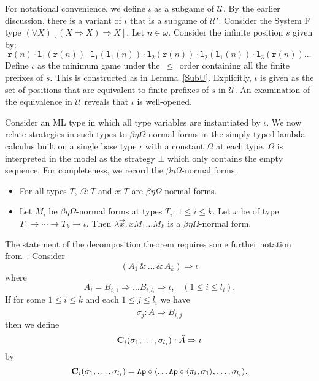 \documentclass[a4paper,11pt]{article}
\newcommand{\UU}{\mathcal{U}}
\newcommand{\llwith}{\, \& \,}
\newcommand{\ginc}{\, \trianglelefteq \,}
\newcommand{\fr}{\mathtt{r}}
\newcommand{\fl}[1]{\mathtt{l}_{#1}}
\newcommand{\LUU}{\mathcal{U'}}
\newcommand{\lang}{\langle}
\newcommand{\rang}{\rangle}
\begin{document}
For notational convenience, we define $\iota$ as a subgame of
$\UU$.  By the earlier discussion, there is a variant of $\iota$
that is a subgame of $\LUU$.  Consider the System F type $(\forall
X) [(X \Rightarrow X) \Rightarrow X] $.  Let $n \in \omega$.
Consider the infinite position $s$ given by:
$$ \fr(n) \cdot \fl{1}(\fr(n)) \cdot \fl{1}(\fl{1}(n)) \cdot
\fl{2}(\fr(n)) \cdot \fl{2}(\fl{1}(n))
\cdot \fl{3}(\fr(n)) \ldots $$ Define $\iota$ as the minimum game
under the $\ginc$ order containing all the finite prefixes of $s$.
This is constructed as in Lemma~\ref{SubU}.  Explicitly, $\iota$ is
given  as  the set of positions that are equivalent to
finite prefixes of
$s$ in $\UU$.  An examination of the equivalence
in $\UU$ reveals that $\iota$ is well-opened.

Consider an ML type in which all type variables are instantiated
by $\iota$.  We now relate strategies in such types  to
$\beta\eta\Omega$-normal forms in the simply typed lambda calculus
built on a single base type $\iota$ with a constant $\Omega$ at
each type. $\Omega$ is interpreted in the model as the strategy
$\bot$ which only contains the empty sequence. For completeness,
we record the  $\beta\eta\Omega$-normal forms.
\begin{itemize}
\item For all types $T$, $\Omega : T$ and $x : T$  are $\beta\eta\Omega$ normal forms.
\item Let $M_i$ be $\beta\eta\Omega$-normal forms at types $T_i$, $1
  \leq i \leq k$.  Let $x$ be of type $T_1 \rightarrow \cdots \rightarrow
T_k \rightarrow \iota$.   Then $\lambda \vec{x}. \, x   M_1
\ldots M_k$ is a $\beta\eta\Omega$-normal form.
\end{itemize}

The statement of the decomposition theorem requires some further
notation from~\cite{AJM00}.   Consider
$$(A_1\llwith\dots\llwith A_k)\Rightarrow \iota$$ where
$$A_i=B_{i,1}\Rightarrow \dots B_{i,l_i}\Rightarrow \iota, \; \;\;
(1\leq i\leq l_i).$$ If for some $1\leq i\leq k$ and each $1\leq
j\leq l_i$ we have
$$\sigma_j:\tilde{A}\Rightarrow B_{i,j}$$ then we define
$${\bf C}_i(\sigma_1,\dots,\sigma_{l_i}):\tilde{A}\Rightarrow \iota$$ by
$${\bf
C}_i(\sigma_1,\dots,\sigma_{l_i})= {\tt Ap }\circ\lang \dots {\tt
Ap }\circ\lang \pi_i,\sigma_1\rang,\ldots,\sigma_{l_i}\rang .$$
\end{document}
